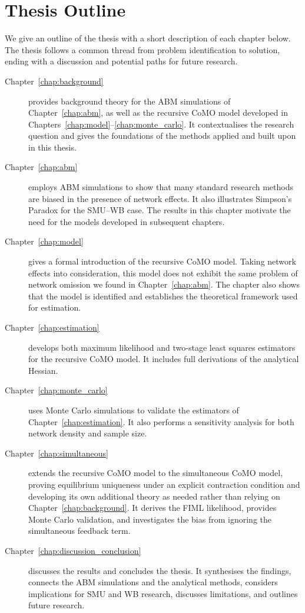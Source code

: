 \section{Thesis Outline}
\label{sec:intro:outline}
We give an outline of the thesis with a short description of each chapter below. The thesis follows a common thread from problem identification to solution, ending with a discussion and potential paths for future research.

\begin{description}
    \item[Chapter~\ref{chap:background}] provides background theory for the ABM simulations of Chapter~\ref{chap:abm}, as well as the recursive CoMO model developed in Chapters~\ref{chap:model}--\ref{chap:monte_carlo}. It contextualises the research question and gives the foundations of the methods applied and built upon in this thesis.

    \item[Chapter~\ref{chap:abm}] employs ABM simulations to show that many standard research methods are biased in the presence of network effects. It also illustrates Simpson's Paradox for the SMU--WB case. The results in this chapter motivate the need for the models developed in subsequent chapters.

    \item[Chapter~\ref{chap:model}] gives a formal introduction of the recursive CoMO model. Taking network effects into consideration, this model does not exhibit the same problem of network omission we found in Chapter~\ref{chap:abm}. The chapter also shows that the model is identified and establishes the theoretical framework used for estimation.

    \item[Chapter~\ref{chap:estimation}] develops both maximum likelihood and two-stage least squares estimators for the recursive CoMO model. It includes full derivations of the analytical Hessian.

    \item[Chapter~\ref{chap:monte_carlo}] uses Monte Carlo simulations to validate the estimators of Chapter~\ref{chap:estimation}. It also performs a sensitivity analysis for both network density and sample size.

    \item[Chapter~\ref{chap:simultaneous}] extends the recursive CoMO model to the simultaneous CoMO model, proving equilibrium uniqueness under an explicit contraction condition and developing its own additional theory as needed rather than relying on Chapter~\ref{chap:background}. It derives the FIML likelihood, provides Monte Carlo validation, and investigates the bias from ignoring the simultaneous feedback term.

    \item[Chapter~\ref{chap:discussion_conclusion}] discusses the results and concludes the thesis. It synthesises the findings, connects the ABM simulations and the analytical methods, considers implications for SMU and WB research, discusses limitations, and outlines future research.
\end{description}


